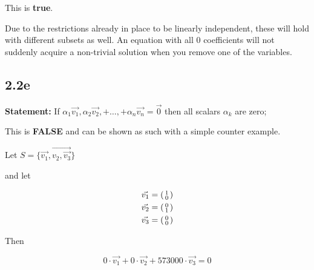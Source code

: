 This is \textbf{true}. 

Due to the restrictions already in place to be linearly independent, these will hold with different subsets as well. An equation with all 0 coefficients will not suddenly acquire a non-trivial solution when you remove one of the variables.

\subsection*{2.2e} \textbf{Statement:} If $\alpha_1\vec{v_1}, \alpha_2\vec{v_2}, + \dots, + \alpha_n\vec{v_n} = \vec{0}$ then all scalars $\alpha_k$ are zero;

This is \textbf{FALSE} and can be shown as such with a simple counter example. 

Let $S = \{\vec{v_{1}}, \vec{v_{2}, \vec{v_{3}}}\}$

and let

\[
	\begin{aligned}
		\vec{v_{1}} &= \left(\begin{smallmatrix} 1 \\ 0 \end{smallmatrix} \right) \\
		\vec{v_{2}} &= \left(\begin{smallmatrix} 0 \\ 1 \end{smallmatrix} \right) \\
		\vec{v_{3}} &= \left(\begin{smallmatrix} 0 \\ 0 \end{smallmatrix} \right) \\
	\end{aligned}
\]

Then

\[0 \cdot \vec{v_{1}} + 0 \cdot \vec{v_{2}} + 573000 \cdot \vec{v_{3}} = 0\]
